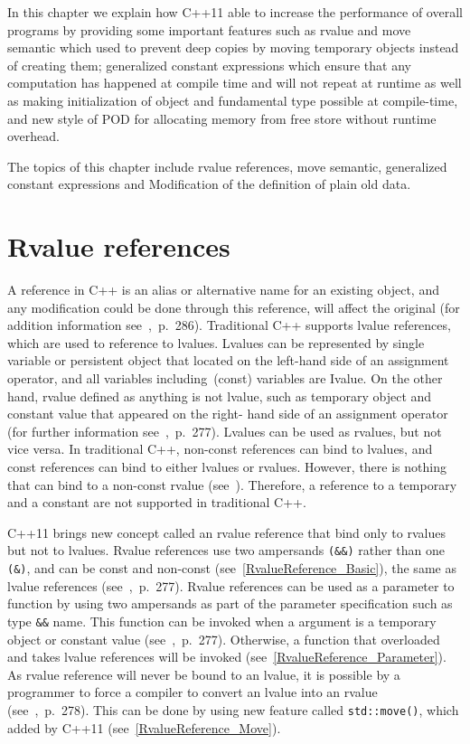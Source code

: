 \documentclass[11pt]{report}
\begin{document}
In this chapter we explain how C++11 able to increase the performance of overall programs by providing some important features such as rvalue and move semantic which used to prevent deep copies by moving temporary objects instead of creating them; generalized constant expressions which ensure that any computation has happened at compile time and will not repeat at runtime as well as making initialization of object and fundamental type possible at compile-time, and new style of POD for allocating memory from free store without runtime overhead.

The topics of this chapter include rvalue references, move semantic, generalized constant expressions and Modification of the definition of plain old data.


\section{Rvalue references}
\label{section: Rvalue references}
A reference in C++ is an alias or alternative name for an existing object, and any modification could be done through this reference, will affect the original (for addition information see~\cite{Gregorie:professionalcpp},~p.~286). Traditional C++ supports lvalue references, which are used to reference to lvalues. Lvalues can be represented by single variable or persistent object that located on the left-hand side of an assignment operator, and all variables including~(const) variables are Ivalue. On the other hand, rvalue defined as anything is not lvalue, such as temporary object and constant value that appeared on the right- hand side of an assignment operator (for further information see~\cite{Gregorie:professionalcpp},~p.~277). Lvalues can be used as rvalues, but not vice versa. In traditional C++, non-const references can bind to lvalues, and const references can bind to either lvalues or rvalues. However, there is nothing that can bind to a non-const rvalue (see~\cite{Stroustrup:2012:Cpp11}). Therefore, a reference to a temporary and a constant are not supported in traditional C++.

C++11 brings new concept called an rvalue reference that bind only to rvalues but not to lvalues. Rvalue references use two ampersands \texttt{(\&\&)} rather than one \texttt{(\&)}, and can be const and non-const (see~\ref{RvalueReference_Basic}), the same as lvalue references  (see~\cite{Gregorie:professionalcpp},~p.~277). Rvalue references can be used as a parameter to function by using two ampersands as part of the parameter specification such as type \texttt{\&\&} name. This function can be invoked when a argument is a temporary object or constant value (see~\cite{Gregorie:professionalcpp},~p.~277). Otherwise, a function that overloaded and takes lvalue references will be invoked (see~\ref{RvalueReference_Parameter}). As rvalue reference will never be bound to an lvalue, it is possible by a programmer to force a compiler to convert an lvalue into an rvalue (see~\cite{Gregorie:professionalcpp},~p.~278). This can be done by using new feature called \texttt{std::move()}, which added by C++11 (see~\ref{RvalueReference_Move}).
\end{document}
